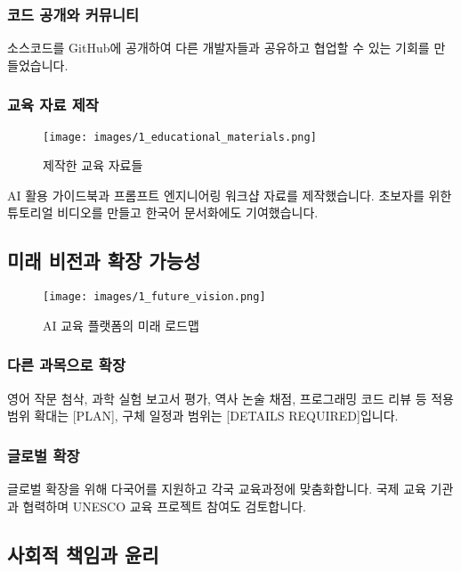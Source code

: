 \subsubsection{코드 공개와 커뮤니티}

소스코드를 GitHub에 공개하여 다른 개발자들과 공유하고 협업할 수 있는 기회를 만들었습니다.

\subsubsection{교육 자료 제작}

\begin{figure}[H]
    \centering
    \texttt{[image: images/1\_educational\_materials.png]}
    \caption{제작한 교육 자료들}
    \label{fig:educational_materials}
\end{figure}

AI 활용 가이드북과 프롬프트 엔지니어링 워크샵 자료를 제작했습니다. 초보자를 위한 튜토리얼 비디오를 만들고 한국어 문서화에도 기여했습니다.

\subsection{미래 비전과 확장 가능성}

\begin{figure}[H]
    \centering
    \texttt{[image: images/1\_future\_vision.png]}
    \caption{AI 교육 플랫폼의 미래 로드맵}
    \label{fig:future_vision}
\end{figure}

\subsubsection{다른 과목으로 확장}

영어 작문 첨삭, 과학 실험 보고서 평가, 역사 논술 채점, 프로그래밍 코드 리뷰 등 적용 범위 확대는 [PLAN], 구체 일정과 범위는 [DETAILS REQUIRED]입니다.

\subsubsection{글로벌 확장}

글로벌 확장을 위해 다국어를 지원하고 각국 교육과정에 맞춤화합니다. 국제 교육 기관과 협력하며 UNESCO 교육 프로젝트 참여도 검토합니다.

\subsection{사회적 책임과 윤리}

